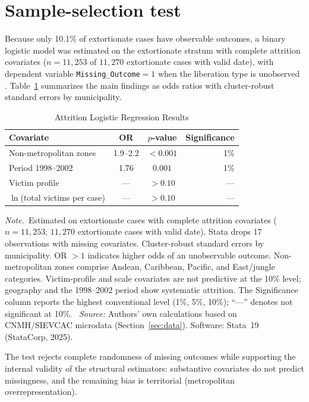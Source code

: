 \documentclass[12pt]{article}
\numberwithin{equation}{section}
\numberwithin{table}{section}
\newcommand{\tabnote}{\par\addvspace{0.4em}\noindent\emph{Note.}}
\newcommand{\tabsource}{\ \textit{Source:} Authors' own calculations based on
CNMH/SIEVCAC microdata (Section~\ref{sec:data}). Software: Stata~19
(StataCorp, 2025).}
\begin{document}
\section{Sample-selection test}
\label{sec:selection}

Because only 10.1\% of extortionate cases have observable outcomes, a binary
logistic model was estimated on the extortionate stratum with complete
attrition covariates ($n=11{,}253$ of $11{,}270$ extortionate cases with valid
date), with dependent variable \texttt{Missing\_Outcome}${=}1$ when the liberation
type is unobserved \citep{LittleRubin2020}. Table~\ref{tab:attrition} summarizes
the main findings as odds ratios with cluster-robust standard errors by
municipality.

\begin{table}[t]
\centering
\caption{Attrition Logistic Regression Results}
\label{tab:attrition}
\small
\begin{tabular}{@{}lccr@{}}
\toprule
Covariate & OR & $p$-value & Significance \\
\midrule
Non-metropolitan zones & 1.9--2.2 & $<0.001$ & 1\% \\
Period 1998--2002 & 1.76 & $0.001$ & 1\% \\
Victim profile & --- & $>0.10$ & --- \\
$\ln$(total victims per case) & --- & $>0.10$ & --- \\
\bottomrule
\end{tabular}
\tabnote\ Estimated on extortionate cases with complete attrition covariates
($n=11{,}253$; $11{,}270$ extortionate cases with valid date). Stata drops 17
observations with missing covariates. Cluster-robust standard errors by
municipality. OR $>1$ indicates higher odds of an unobservable outcome.
Non-metropolitan zones comprise Andean, Caribbean, Pacific, and East/jungle
categories. Victim-profile and scale covariates are not predictive at the 10\%
level; geography and the 1998--2002 period show systematic attrition. The
Significance column reports the highest conventional level (1\%, 5\%, 10\%);
``---'' denotes not significant at 10\%.
\tabsource
\end{table}

The test rejects complete randomness of missing outcomes while supporting
the internal validity of the structural estimators: substantive covariates do
not predict missingness, and the remaining bias is territorial (metropolitan
overrepresentation).
\end{document}
